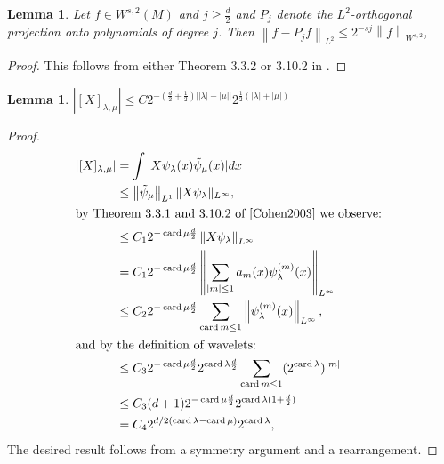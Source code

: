 \documentclass[12pt]{amsart}
\newcommand{\norm}[1]{\ensuremath{\left\| #1 \right\| }}
\newcommand{\abs}[1]{\ensuremath{ | #1 | }}
\newtheorem{lem}[thm]{Lemma}
\DeclareMathOperator{\card}{card}
\begin{document}
\begin{lem} \label{lem:projection_bound}
	Let $f \in W^{s,2}(M)$ and $j \geq \frac{d}{2}$ and $P_j$ denote the $L^2$-orthogonal projection onto polynomials of degree $j$.
	Then $\norm{f - P_j f}_{L^2} \leq  2^{-sj}\norm{f}_{W^{s,2}}$,
\end{lem}
\begin{proof}
	This follows from either Theorem 3.3.2 or 3.10.2 in \cite{Cohen2003}.
\end{proof}

\begin{lem} \label{lem:matrix_bound}
	$\abs{[X]_{\lambda,\mu}} \leq C 2^{-(\frac{d}{2}+\frac{1}{2})\abs{\abs{\lambda}-\abs{\mu}}}2^{\frac{1}{2}(\abs{\lambda}+\abs{\mu})}$
\end{lem}
\begin{proof}
	\begin{align*}
		\abs{[X]_{\lambda,\mu}} 	&= \int \abs{X \psi_{\lambda}(x) \tilde{\psi}_{\mu}(x)} dx \\
								&\leq \norm{\tilde{\psi}_\mu}_{L^1} \| X \psi_\lambda \|_{L^\infty}, \\ %
							\intertext{by Theorem 3.3.1 and 3.10.2 of \cite{Cohen2003} we observe: }
								&\leq C_1 2^{-\card{\mu}\frac{d}{2}}\norm{X\psi_{\lambda}}_{L^{\infty}} \\
								&= C_1 2^{-\card{\mu}\frac{d}{2}}\norm{ \sum_{\abs{m} \leq 1 } a_m(x) \psi^{(m)}_\lambda(x) }_{L^{\infty}} \\
								&\leq C_2 2^{-\card{\mu}\frac{d}{2}}\sum_{\card{m}\leq 1}\norm{\psi_{\lambda}^{(m)}(x)}_{L^{\infty}} , \\
							\intertext{and by the definition of wavelets:}
								&\leq C_3 2^{-\card{\mu}\frac{d}{2}} 2^{\card{\lambda}\frac{d}{2}} \sum_{\card{m}\leq 1} (2^{\card{\lambda}})^{\abs{m}} \\
								&\leq C_3 (d+1) 2^{-\card{\mu}\frac{d}{2}} 2^{\card{\lambda}(1+\frac{d}{2})} \\
								&= C_4 2^{d/2(\card{\lambda} - \card{\mu})}2^{\card{\lambda}},
	\end{align*}
	The desired result follows from a symmetry argument and a rearrangement.
\end{proof}
\end{document}
